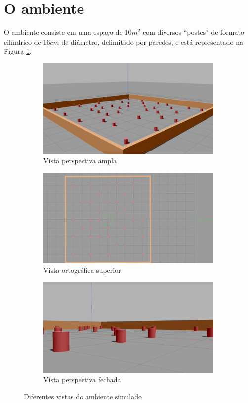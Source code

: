 \section{O ambiente}
O ambiente consiste em uma espaço de 10$m^2$ com diversos ``postes'' de formato cilíndrico de 16$cm$ de diâmetro, delimitado por paredes, e está representado na Figura \ref{fig:environment}.
\begin{figure}[h]
  \begin{subfigure}{.50\textwidth}
    \includegraphics[width=\textwidth]{figs/environment-perspective.jpg}
    \caption{Vista perspectiva ampla}
  \end{subfigure}
  \hfill
  \begin{subfigure}{.50\textwidth}
    \includegraphics[width=\textwidth]{figs/environment-birds-eye-of-view.jpg}
    \caption{Vista ortográfica superior}
  \end{subfigure}
  \hfill
  \begin{subfigure}{\textwidth}
    \centering
    \includegraphics[width=.5\textwidth]{figs/environment-closer-perspective.jpg}
    \caption{Vista perspectiva fechada}
  \end{subfigure}
  \caption{Diferentes vistas do ambiente simulado}
  \label{fig:environment}
\end{figure}

